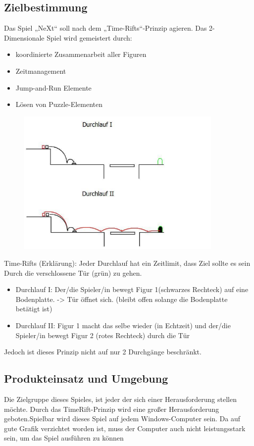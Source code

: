 \subsection{Zielbestimmung}
Das Spiel „NeXt“ soll nach dem „Time-Rifts“-Prinzip agieren.
Das 2-Dimensionale Spiel wird gemeistert durch:
\begin{itemize}
	\item koordinierte Zusammenarbeit aller Figuren
	\item Zeitmanagement
	\item Jump-and-Run Elemente
	\item Lösen von Puzzle-Elementen
\end{itemize}
\begin{figure}[H]
	\centering
	\includegraphics[width=10cm]{images/TimeRift.png}
\end{figure}
Time-Rifts (Erklärung): Jeder Durchlauf hat ein Zeitlimit, dass Ziel sollte es sein Durch die
verschlossene Tür (grün) zu gehen.
\begin{itemize}
	\item Durchlauf I:
	Der/die Spieler/in bewegt Figur 1(schwarzes Rechteck) auf eine Bodenplatte.
	-> Tür öffnet sich. (bleibt offen solange die Bodenplatte betätigt ist)
	\item Durchlauf II:
	Figur 1 macht das selbe wieder (in Echtzeit) und der/die Spieler/in bewegt Figur 2 (rotes
	Rechteck) durch die Tür
\end{itemize}
Jedoch ist dieses Prinzip nicht auf nur 2 Durchgänge beschränkt.
\subsection{Produkteinsatz und Umgebung}
Die Zielgruppe dieses Spieles, ist jeder der sich einer Herausforderung stellen möchte. Durch das TimeRift-Prinzip wird eine großer Herausforderung geboten.Spielbar wird dieses Spiel auf jedem Windows-Computer sein. Da auf gute Grafik verzichtet worden ist, muss der Computer auch nicht leistungsstark sein, um das Spiel ausführen zu können 

